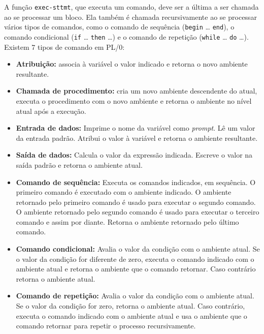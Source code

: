 \documentclass{scrartcl}
\begin{document}
A função \texttt{exec-sttmt}, que executa um comando, deve ser a última a ser chamada
ao se processar um bloco. Ela também é chamada recursivamente ao se processar
vários tipos de comandos, como o comando de sequência (\texttt{begin} \ldots{} \texttt{end}), o
comando condicional (\texttt{if} \ldots{} \texttt{then} \ldots{}) e o comando de repetição (\texttt{while} \ldots{}
\texttt{do} \ldots{}). Existem 7 tipos de comando em PL/0:
\begin{itemize}
\item \textbf{Atribuição:} associa à variável o valor indicado e retorna o novo ambiente
resultante.
\item \textbf{Chamada de procedimento:} cria um novo ambiente descendente do atual, executa
o procedimento com o novo ambiente e retorna o ambiente no nível atual após a
execução.
\item \textbf{Entrada de dados:} Imprime o nome da variável como \emph{prompt}. Lê um valor da
entrada padrão. Atribui o valor à variável e retorna o ambiente resultante.
\item \textbf{Saída de dados:} Calcula o valor da expressão indicada. Escreve o valor na
saída padrão e retorna o ambiente atual.
\item \textbf{Comando de sequência:} Executa os comandos indicados, em sequência. O
primeiro comando é executado com o ambiente indicado. O ambiente retornado
pelo primeiro comando é usado para executar o segundo comando. O ambiente
retornado pelo segundo comando é usado para executar o terceiro comando e
assim por diante. Retorna o ambiente retornado pelo último comando.
\item \textbf{Comando condicional:} Avalia o valor da condição com o ambiente atual. Se o
valor da condição for diferente de zero, executa o comando indicado com o
ambiente atual e retorna o ambiente que o comando retornar. Caso contrário
retorna o ambiente atual.
\item \textbf{Comando de repetição:} Avalia o valor da condição com o ambiente atual. Se o
valor da condição for zero, retorna o ambiente atual. Caso contrário, executa
o comando indicado com o ambiente atual e usa o ambiente que o comando
retornar para repetir o processo recursivamente.
\end{itemize}
\end{document}
